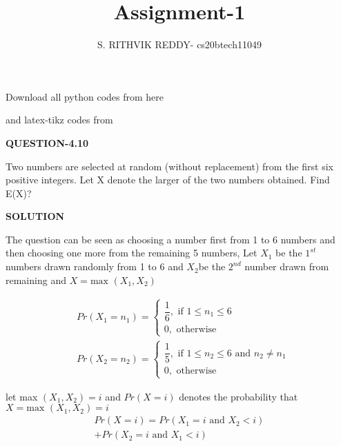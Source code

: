 \documentclass[a4paper]{article}
\title{Assignment-1}
\author{S. RITHVIK REDDY- cs20btech11049}
\date{}
\begin{document}
\maketitle
\noindent
Download all python codes from here

\begin{multicols*}{2}
\noindent
{}
    
\vspace{0.3cm}
and latex-tikz codes from  

\vspace{0.3cm}  
    
   
\vspace{0.5cm}
\textbf{QUESTION-4.10}
\vspace{0.5cm}

Two numbers are selected at random (without replacement) from the first six positive integers. Let X denote the larger of the two numbers obtained. Find E(X)?



\vspace{0.5cm}
\textbf{SOLUTION}
\vspace{0.5cm}

The question can be seen as choosing a number first from 1 to 6 numbers and then choosing one more from the remaining 5 numbers, Let $X_1$ be the $1^{st}$ numbers drawn randomly from 1 to 6 and $X_2$be the $2^{nd}$ number drawn from remaining and $X = \text{max } (X_1,X_2)$

\vspace{0.3cm}
\begin{align}
& Pr(X_1=n_1)= \begin{cases}
\dfrac{1}{6},  \text{ if } 1 \leq n_1 \leq 6\\
0,  \text{  otherwise }
\end{cases}\\
& Pr(X_2=n_2)= \begin{cases}
\dfrac{1}{5},  \text{ if } 1 \leq n_2 \leq 6 \text{ and }n_2 \neq n_1\\
0,  \text{  otherwise }
\end{cases}
\end{align}

let max $(X_1,X_2)=i$ and $Pr(X=i)$ denotes the probability that $X = \text{max } (X_1,X_2)=i$
 \begin{multline}
Pr(X=i)=Pr(X_1=i\text{ and }X_2<i)\\
 +Pr(X_2=i\text{ and }X_1<i) \label{eqn_(0.0.1)}
\end{multline}
 


\end{multicols*}
\end{document}
